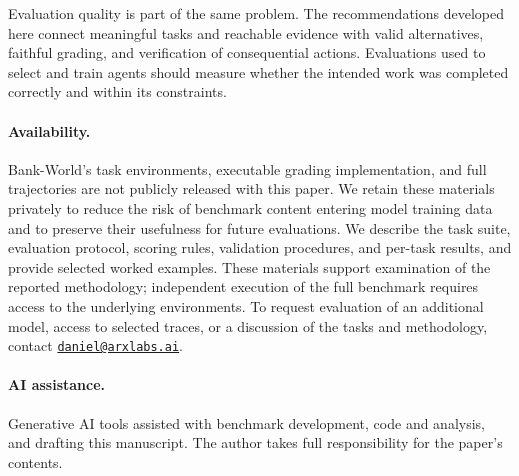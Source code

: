 \documentclass[11pt,letterpaper]{article}
\begin{document}
Evaluation quality is part of the same problem. The recommendations developed here connect meaningful tasks and reachable evidence with valid alternatives, faithful grading, and verification of consequential actions. Evaluations used to select and train agents should measure whether the intended work was completed correctly and within its constraints.

\paragraph{Availability.}
Bank-World's task environments, executable grading implementation, and full trajectories are not publicly released with this paper. We retain these materials privately to reduce the risk of benchmark content entering model training data and to preserve their usefulness for future evaluations. We describe the task suite, evaluation protocol, scoring rules, validation procedures, and per-task results, and provide selected worked examples. These materials support examination of the reported methodology; independent execution of the full benchmark requires access to the underlying environments. To request evaluation of an additional model, access to selected traces, or a discussion of the tasks and methodology, contact \href{mailto:daniel@arxlabs.ai}{\texttt{daniel@arxlabs.ai}}.

\paragraph{AI assistance.}
Generative AI tools assisted with benchmark development, code and analysis, and drafting this manuscript. The author takes full responsibility for the paper’s contents.
\end{document}
